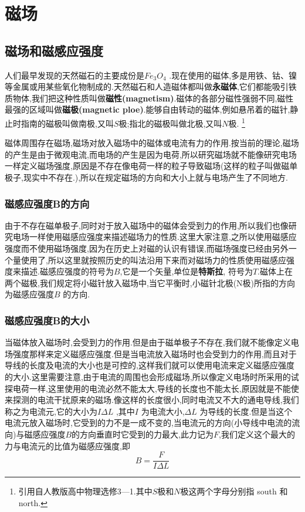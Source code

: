 \chapter{磁场}

\section{磁场和磁感应强度}

人们最早发现的天然磁石的主要成份是$Fe_3O_4$ .现在使用的磁体,多是用铁、钴、镍等金属或用某些氧化物制成的.天然磁石和人造磁体都叫做{\bf 永磁体},它们都能吸引铁质物体,我们把这种性质叫做{\bf 磁性(magnetism)}.磁体的各部分磁性强弱不同,磁性最强的区域叫做{\bf 磁极(magnetic ploe)}.能够自由转动的磁体,例如悬吊着的磁针,静止时指南的磁极叫做南极,又叫$S$极;指北的磁极叫做北极,又叫$N$极.
\footnote{引用自人教版高中物理选修3---1.其中$S$极和$N$极这两个字母分别指 south 和north.}

磁体周围存在磁场,磁场对放入磁场中的磁体或电流有力的作用.按当前的理论,磁场的产生是由于微观电流,而电场的产生是因为电荷,所以研究磁场就不能像研究电场一样定义磁场强度,原因是不存在像电荷一样的粒子导致磁场(这样的粒子叫做磁单极子,现实中不存在.),所以在规定磁场的方向和大小上就与电场产生了不同地方.

\subsection{磁感应强度B的方向}

由于不存在磁单极子,同时对于放入磁场中的磁体会受到力的作用,所以我们也像研究电场一样使用磁感应强度来描述磁场力的性质.这里大家注意,之所以使用磁感应强度而不使用磁场强度,因为在历史上对磁的认识有错误,而磁场强度已经由另外一个量使用了,所以这里就按照历史的叫法沿用下来而对磁场力的性质使用磁感应强度来描述.磁感应强度的符号为$B$,它是一个矢量,单位是{\bf 特斯拉}, 符号为$T$.磁体上在两个磁极,我们规定将小磁针放入磁场中,当它平衡时,小磁针北极(N极)所指的方向为磁感应强度$B$ 的方向.

\subsection{磁感应强度B的大小}

当磁体放入磁场时,会受到力的作用.但是由于磁单极子不存在,我们就不能像定义电场强度那样来定义磁感应强度.但是当电流放入磁场时也会受到力的作用,而且对于导线的长度及电流的大小也是可控的,这样我们就可以使用电流来定义磁感应强度的大小.这里需要注意,由于电流的周围也会形成磁场,所以像定义电场时所采用的试探电荷一样,这里使用的电流必然不能太大,导线的长度也不能太长,原因就是不能使来探测的电流干扰原来的磁场.像这样的长度很小,同时电流又不大的通电导线,我们称之为电流元,它的大小为$I\Delta L$ ,其中$I$ 为电流大小,$\Delta L$ 为导线的长度.但是当这个电流元放入磁场时,它受到的力不是一成不变的,当电流元的方向(小导线中电流的流向)与磁感应强度$B$的方向垂直时它受到的力最大,此力记为$F$,我们定义这个最大的力与电流元的比值为磁感应强度,即
\begin{equation}
  B=\frac{F}{I\Delta L}
  \label{eq:magneticB}
\end{equation}

